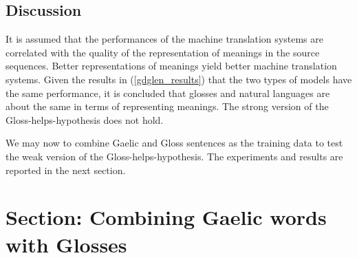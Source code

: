 \documentclass[a4paper]{article}
\begin{document}
\subsection{Discussion}
It is assumed that the performances of the machine translation systems are correlated with the quality of the representation of meanings in the source sequences. Better representations of meanings yield better machine translation systems. Given the results in (\ref{gdglen_results}) that the two types of models have the same performance, it is concluded that glosses and natural languages are about the same in terms of representing meanings. The strong version of the Gloss-helps-hypothesis does not hold. 

We may now to combine Gaelic and Gloss sentences as the training data to test the weak version of the Gloss-helps-hypothesis. The experiments and results are reported in the next section. 

\section{Section: Combining Gaelic words with Glosses }\label{gd_plus_gl_to_en}
\end{document}
